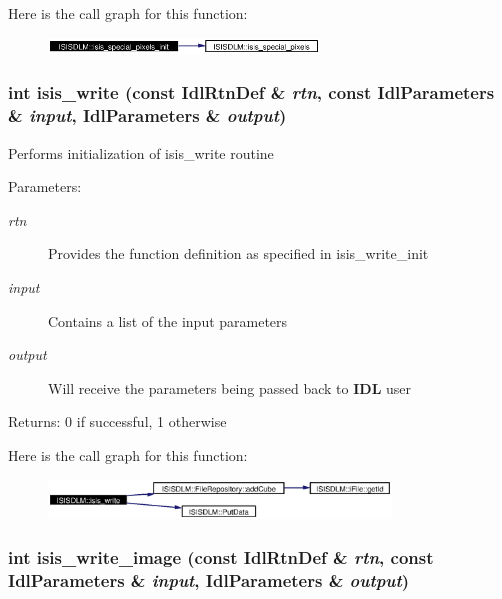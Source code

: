 Here is the call graph for this function:\begin{figure}[H]
\begin{center}
\leavevmode
\includegraphics[width=204pt]{namespaceISISDLM_a34_cgraph}
\end{center}
\end{figure}
\subsubsection{\setlength{\rightskip}{0pt plus 5cm}int isis\_\-write (const Idl\-Rtn\-Def \& {\em rtn}, const Idl\-Parameters \& {\em input}, Idl\-Parameters \& {\em output})}\label{namespaceISISDLM_a37}


Performs initialization of isis\_\-write routine \begin{Desc}
\item[Parameters:]
\begin{description}
\item[{\em rtn}]Provides the function definition as specified in isis\_\-write\_\-init \item[{\em input}]Contains a list of the input parameters \item[{\em output}]Will receive the parameters being passed back to {\bf IDL} user \end{description}
\end{Desc}
\begin{Desc}
\item[Returns:]0 if successful, 1 otherwise \end{Desc}


Here is the call graph for this function:\begin{figure}[H]
\begin{center}
\leavevmode
\includegraphics[width=258pt]{namespaceISISDLM_a37_cgraph}
\end{center}
\end{figure}
\subsubsection{\setlength{\rightskip}{0pt plus 5cm}int isis\_\-write\_\-image (const Idl\-Rtn\-Def \& {\em rtn}, const Idl\-Parameters \& {\em input}, Idl\-Parameters \& {\em output})}\label{namespaceISISDLM_a39}


